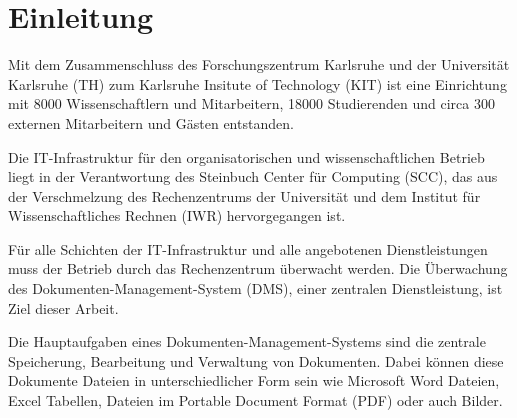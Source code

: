 \section{Einleitung}







Mit dem Zusammenschluss des Forschungszentrum Karlsruhe und der Universität Karlsruhe (TH) zum Karlsruhe Insitute of Technology (KIT) ist eine Einrichtung mit 8000 Wissenschaftlern und Mitarbeitern, 18000 Studierenden und circa 300 externen Mitarbeitern und Gästen entstanden.


Die IT-Infrastruktur für den organisatorischen und wissenschaftlichen Betrieb liegt in der Verantwortung des Steinbuch Center für Computing (SCC), das aus der Verschmelzung des Rechenzentrums der Universität und dem Institut für Wissenschaftliches Rechnen (IWR) hervorgegangen ist.

Für alle Schichten der IT-Infrastruktur und alle angebotenen Dienstleistungen muss der Betrieb durch das Rechenzentrum überwacht werden.
Die Überwachung des Dokumenten-Management-System (\gls{DMS}), einer zentralen Dienstleistung, ist Ziel dieser Arbeit.



Die Hauptaufgaben eines Dokumenten-Management-Systems sind die zentrale Speicherung, Bearbeitung und Verwaltung von Dokumenten.
Dabei können diese Dokumente Dateien in unterschiedlicher Form sein wie Microsoft Word Dateien, Excel Tabellen, Dateien im Portable Document Format (\gls{PDF}) oder auch Bilder.

